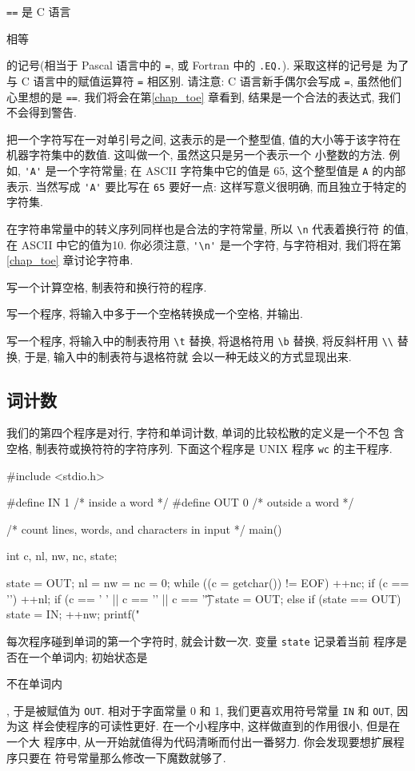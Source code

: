 \verb"==" 是 C 语言 \begin{myquotation}相等\end{myquotation}的记号(相当于
Pascal 语言中的 \verb"=", 或 Fortran 中的 \verb".EQ."). 采取这样的记号是
为了与 C 语言中的赋值运算符 \verb"=" 相区别. 请注意: C 语言新手偶尔会写成
\verb"=", 虽然他们心里想的是 \verb"==". 我们将会在第\ref{chap_toe} 章看到,
结果是一个合法的表达式, 我们不会得到警告.

把一个字符写在一对单引号之间, 这表示的是一个整型值, 值的大小等于该字符在
机器字符集中的数值. 这叫做一个, 虽然这只是另一个表示一个
小整数的方法. 例如, \verb"'A'" 是一个字符常量; 在 ASCII 字符集中它的值是
65, 这个整型值是 \verb"A" 的内部表示. 当然写成 \verb"'A'" 要比写在 \verb"65"
要好一点: 这样写意义很明确, 而且独立于特定的字符集.

在字符串常量中的转义序列同样也是合法的字符常量, 所以 \verb"\n" 代表着换行符
的值, 在 ASCII 中它的值为10. 你必须注意, \verb"'\n'" 是一个字符, 与字符相对,
我们将在第\ref{chap_toe} 章讨论字符串.

\exercise 写一个计算空格, 制表符和换行符的程序.

\exercise 写一个程序, 将输入中多于一个空格转换成一个空格, 并输出.

\exercise 写一个程序, 将输入中的制表符用 \verb"\t" 替换, 将退格符用 
\verb"\b" 替换, 将反斜杆用 \verb"\\" 替换, 于是, 输入中的制表符与退格符就
会以一种无歧义的方式显现出来.

\subsection{词计数}
我们的第四个程序是对行, 字符和单词计数, 单词的比较松散的定义是一个不包
含空格, 制表符或换符符的字符序列. 下面这个程序是 UNIX 程序 \verb"wc" 
的主干程序.
\begin{myverbatim}
    #include <stdio.h>

    #define IN  1   /* inside a word */
    #define OUT 0   /* outside a word */

    /* count lines, words, and characters in input */
    main()
    {
        int c, nl, nw, nc, state;

        state = OUT;
        nl = nw = nc = 0;
        while ((c = getchar()) != EOF) {
            ++nc;
            if (c == '\n')
                ++nl;
            if (c == ' ' || c == '\n' || c == '\t')
                state = OUT;
            else if (state == OUT) {
                state = IN;
                ++nw;
            }
        }
        printf("%
    }
\end{myverbatim}
每次程序碰到单词的第一个字符时, 就会计数一次. 变量 \verb"state" 记录着当前
程序是否在一个单词内; 初始状态是%
\begin{myquotation}不在单词内\end{myquotation}, 于是被赋值为 \verb"OUT".
相对于字面常量 0 和 1, 我们更喜欢用符号常量 \verb"IN" 和 \verb"OUT", 因为这
样会使程序的可读性更好. 在一个小程序中, 这样做直到的作用很小, 但是在一个大
程序中, 从一开始就值得为代码清晰而付出一番努力. 你会发现要想扩展程序只要在
符号常量那么修改一下魔数就够了.

